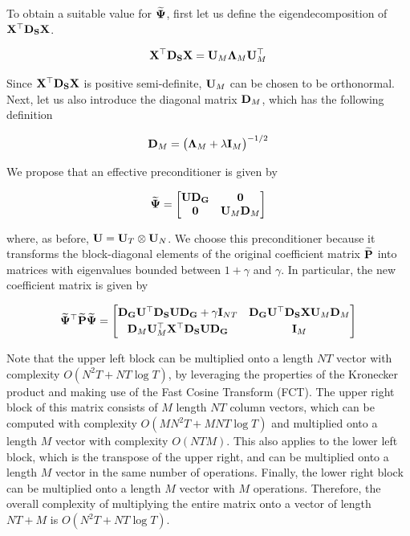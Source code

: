 To obtain a suitable value for $\widetilde{\mathbf{\Psi}}$, first let us define the eigendecomposition of $\mathbf{X}^\top\mathbf{D}_{\mathbf{S}} \mathbf{X}$. 

\begin{equation}
    \mathbf{X}^\top\mathbf{D}_{\mathbf{S}} \mathbf{X} = \mathbf{U}_M \mathbf{\Lambda}_M \mathbf{U}_M^\top
\end{equation}

Since $\mathbf{X}^\top\mathbf{D}_{\mathbf{S}} \mathbf{X}$ is positive semi-definite, $\mathbf{U}_M$ can be chosen to be orthonormal. Next, let us also introduce the diagonal matrix $\mathbf{D}_M$, which has the following definition 

\begin{equation}
    \mathbf{D}_M = \big(\mathbf{\Lambda}_M + \lambda \mathbf{I}_M \big)^{-1/2}
\end{equation}

We propose that an effective preconditioner is given by 

\begin{equation}
    \widetilde{\mathbf{\Psi}} =  \begin{bmatrix}
        \mathbf{U} \mathbf{D}_{\mathbf{G}} & \mathbf{0} \\
        \mathbf{0} & \mathbf{U}_M \mathbf{D}_M 
    \end{bmatrix}
\end{equation}


where, as before, $\mathbf{U} = \mathbf{U}_T \otimes \mathbf{U}_N $. We choose this preconditioner because it transforms the block-diagonal elements of the original coefficient matrix $\widetilde{\mathbf{P}}$ into matrices with eigenvalues bounded between $1 + \gamma$ and $\gamma$. In particular, the new coefficient matrix is given by

\begin{equation*}
    \widetilde{\mathbf{\Psi}}^\top \widetilde{\mathbf{P}}  \widetilde{\mathbf{\Psi}} = 
       \begin{bmatrix}
        \mathbf{D}_{\mathbf{G}} \mathbf{U}^\top \mathbf{D}_{\mathbf{S}} \mathbf{U} \mathbf{D}_{\mathbf{G}} + \gamma \mathbf{I}_{NT}  &  \mathbf{D}_{\mathbf{G}} \mathbf{U}^\top \mathbf{D}_{\mathbf{S}} \mathbf{X} \mathbf{U}_M \mathbf{D}_M \\[0.1cm] 
        \mathbf{D}_M \mathbf{U}_M^\top \mathbf{X}^\top \mathbf{D}_{\mathbf{S}} \mathbf{U} \mathbf{D}_{\mathbf{G}} & \mathbf{I}_M
        \end{bmatrix}
\end{equation*}

Note that the upper left block can be multiplied onto a length $NT$ vector with complexity $O(N^2T + NT \log T)$, by leveraging the properties of the Kronecker product and making use of the Fast Cosine Transform (FCT). The upper right block of this matrix consists of $M$ length $NT$ column vectors, which can be computed with complexity $O(MN^2T + MNT \log T)$ and multiplied onto a length $M$ vector with complexity $O(NTM)$. This also applies to the lower left block, which is the transpose of the upper right, and can be multiplied onto a length $M$ vector in the same number of operations. Finally, the lower right block can be multiplied onto a length $M$ vector with $M$ operations. Therefore, the overall complexity of multiplying the entire matrix onto a vector of length $NT + M$ is $O(N^2T + NT \log T)$. 

